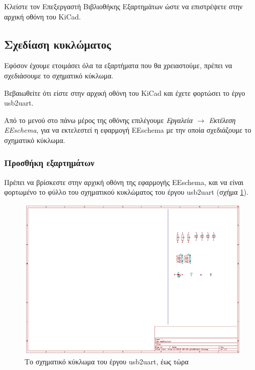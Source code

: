 \documentclass[a4paper]{article}
\begin{document}
Kλείστε τον Επεξεργαστή Βιβλιοθήκης Εξαρτημάτων ώστε να επιστρέψετε στην αρχική οθόνη του \textenglish{KiCad}.


\subsection{Σχεδίαση κυκλώματος}
Εφόσον έχουμε ετοιμάσει όλα τα εξαρτήματα που θα χρειαστούμε, πρέπει να σχεδιάσουμε το σχηματικό κύκλωμα. 

Βεβαιωθείτε ότι είστε στην αρχική οθόνη του \textenglish{KiCad} και έχετε φορτώσει το έργο usb2uart.

Από το μενού στο πάνω μέρος της οθόνης επιλέγουμε \textit{Εργαλεία $\rightarrow$ Εκτέλεση \textenglish{EEschema}}, για να εκτελεστεί η εφαρμογή \textenglish{EEschema} με την οποία σχεδιάζουμε το σχηματικό κύκλωμα. 

\subsubsection{Προσθήκη εξαρτημάτων}

Πρέπει να βρίσκεστε στην αρχική οθόνη της εφαρμογής \textenglish{EEschema}, και να είναι φορτωμένο το φύλλο του σχηματικού κυκλώματος του έργου usb2uart (σχήμα \ref{fig:eesch-circ-noic}).

\begin{figure}
  \begin{center}
    \includegraphics[width=.9\textwidth]{img/eesch-circ-noic.png}
    \caption{Το σχηματικό κύκλωμα του έργου usb2uart, έως τώρα}
    \label{fig:eesch-circ-noic}
  \end{center}
\end{figure}
\end{document}
